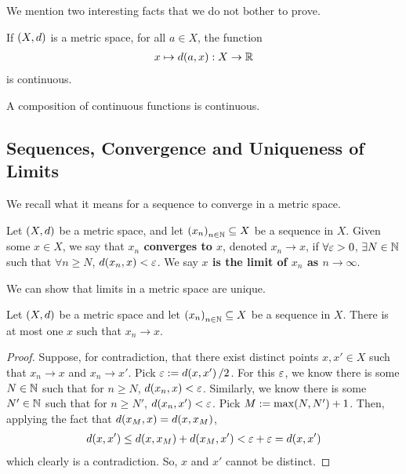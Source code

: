 We mention two interesting facts that we do not bother to prove.

\begin{boxexercise}
    If $\left( X, d \right)$ is a metric space, for all $a \in X$, the function
    \begin{align*}
        x \mapsto d\!\left( a, x \right) : X \to \mathbb{R}
    \end{align*}
    is continuous.
\end{boxexercise}

\begin{boxexercise}
    A composition of continuous functions is continuous.
\end{boxexercise}


\subsection{Sequences, Convergence and Uniqueness of Limits}


We recall what it means for a sequence to converge in a metric space.

\begin{boxdefinition}\label{Ch1:Def:Convergence_Metric}
    Let $\left( X, d \right)$ be a metric space, and let $\left( x_n \right)_{n \in \mathbb{N}} \subseteq X$ be a sequence in $X$. Given some $x \in X$, we say that \textbf{$x_n$ converges to $x$}, denoted $x_n \to x$, if $\forall \varepsilon > 0$, $\exists N \in \mathbb{N}$ such that $\forall n \geq N$, $d\!\left( x_n, x \right) < \varepsilon$. We say \textbf{$x$ is the limit of $x_n$ as $n \to \infty$}.
\end{boxdefinition}

We can show that limits in a metric space are unique.

\begin{boxproposition}\label{Ch1:Prop:Uniqueness_of_Limits_Metric}
    Let $\left( X, d \right)$ be a metric space and let $\left( x_n \right)_{n \in \mathbb{N}} \subseteq X$ be a sequence in $X$. There is at most one $x$ such that $x_n  \to x$.
\end{boxproposition}
\begin{proof}
    Suppose, for contradiction, that there exist distinct points $x, x' \in X$ such that $x_n \to x$ and $x_n \to x'$. Pick $\varepsilon := d\!\left( x, x' \right) / 2$. For this $\varepsilon$, we know there is some $N \in \mathbb{N}$ such that for $n \geq N$, $d\!\left( x_n, x \right) < \varepsilon$. Similarly, we know there is some $N' \in \mathbb{N}$ such that for $n \geq N'$, $d\!\left( x_n, x' \right) < \varepsilon$. Pick $M := \max\!\left( N, N' \right) + 1$. Then, applying the fact that $d\!\left( x_M, x \right) = d\!\left( x, x_M \right)$,
    \begin{align*}
        d\!\left( x, x' \right) \leq d\!\left( x, x_M \right) + d\!\left( x_M, x' \right) < \varepsilon + \varepsilon = d\!\left( x, x' \right)
    \end{align*}
    which clearly is a contradiction. So, $x$ and $x'$ cannot be distinct.
\end{proof}

